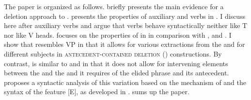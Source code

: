 \documentclass[output=paper,colorlinks,citecolor=brown,]{langsci/langscibook}
\begin{document}
\newpage
\begin{exe}
\ex
\begin{xlist}
\end{xlist}
\end{exe}

\noindent The paper is organized as follows.  briefly presents the main evidence for a deletion approach to .  presents the properties of auxiliary and  verbs in . I discuss here  after auxiliary verbs and argue that  verbs behave syntactically neither like T nor like V heads.  focuses on the properties of  in  in comparison with ,  and . I show that   resembles  VP  in that it allows for various extractions from the  and for different subjects in \textsc{antecedent-contained deletion} () constructions. By contrast,   is similar to  and  in that it does not allow for intervening elements between the   and the  and it requires  of the elided phrase and its antecedent.  proposes a syntactic analysis of this variation based on the mechanism of  and the syntax of the feature [E], as developed in \cite{Aelbrecht2010}.  sums up the paper.
\end{document}
